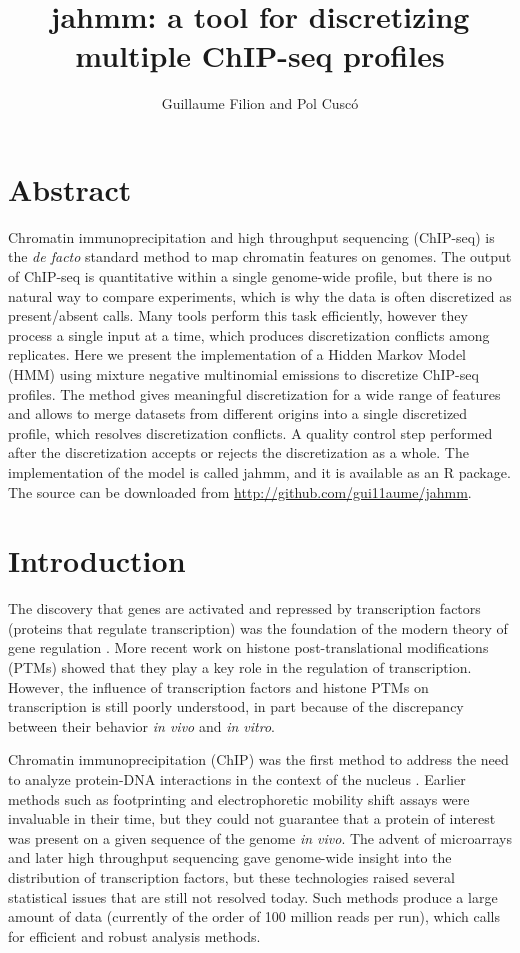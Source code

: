 \documentclass[12pt]{article}
\title{jahmm: a tool for discretizing multiple ChIP-seq profiles}
\author{Guillaume Filion and Pol Cusc\'o}
\begin{document}
\maketitle

\section{Abstract}
Chromatin immunoprecipitation and high throughput sequencing (ChIP-seq) is the \textit{de facto} standard method to map chromatin features on genomes. The output of ChIP-seq is quantitative within a single genome-wide profile, but there is no natural way to compare experiments, which is why the data is often discretized as present/absent calls. Many tools perform this task efficiently, however they process a single input at a time, which produces discretization conflicts among replicates. Here we present the implementation of a Hidden Markov Model (HMM) using mixture negative multinomial emissions to discretize ChIP-seq profiles. The method gives meaningful discretization for a wide range of features and allows to merge datasets from different origins into a single discretized profile, which resolves discretization conflicts. A quality control step performed after the discretization accepts or rejects the discretization as a whole. The implementation of the model is called jahmm, and it is available as an R package. The source can be downloaded from \url{http://github.com/gui11aume/jahmm}.



\section{Introduction}
The discovery that genes are activated and repressed by transcription factors (proteins that regulate transcription) was the foundation of the modern theory of gene regulation \cite{pmid15950866}. More recent work on histone post-translational modifications (PTMs) showed that they play a key role in the regulation of transcription. However, the influence of transcription factors and histone PTMs on transcription is still poorly understood, in part because of the discrepancy between their behavior \textit{in vivo} and \textit{in vitro}.

Chromatin immunoprecipitation (ChIP) was the first method to address the need to analyze protein-DNA interactions in the context of the nucleus \cite{pmid2454748}. Earlier methods such as footprinting and electrophoretic mobility shift assays were invaluable in their time, but they could not guarantee that a protein of interest was present on a given sequence of the genome \textit{in vivo}. The advent of microarrays and later high throughput sequencing gave genome-wide insight into the distribution of transcription factors, but these technologies raised several statistical issues that are still not resolved today. Such methods produce a large amount of data (currently of the order of 100 million reads per run), which calls for efficient and robust analysis methods.
\end{document}
